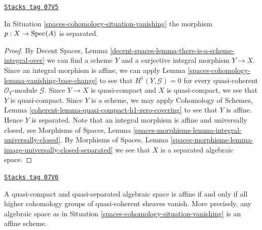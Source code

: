 \begin{lemma}
\label{spaces-cohomology-lemma-vanishing-separated}
\href{https://stacks.math.columbia.edu/tag/07V5}{\texttt{Stacks tag 07V5}}

In Situation \ref{spaces-cohomology-situation-vanishing} the morphism $p : X \to \operatorname{Spec}(A)$ is
separated.
\end{lemma}

\begin{proof}
By Decent Spaces, Lemma
\ref{decent-spaces-lemma-there-is-a-scheme-integral-over}
we can find a scheme $Y$ and a surjective integral morphism
$Y \to X$. Since an integral morphism is affine, we can apply
Lemma \ref{spaces-cohomology-lemma-vanishing-base-change}
to see that $H^1(Y, \mathcal{G}) = 0$ for every
quasi-coherent $\mathcal{O}_Y$-module $\mathcal{G}$.
Since $Y \to X$ is quasi-compact and $X$ is quasi-compact,
we see that $Y$ is quasi-compact.
Since $Y$ is a scheme, we may apply
Cohomology of Schemes, Lemma
\ref{coherent-lemma-quasi-compact-h1-zero-covering}
to see that $Y$ is affine. Hence $Y$ is separated.
Note that an integral morphism is affine and universally closed, see
Morphisms of Spaces, Lemma
\ref{spaces-morphisms-lemma-integral-universally-closed}.
By Morphisms of Spaces, Lemma
\ref{spaces-morphisms-lemma-image-universally-closed-separated}
we see that $X$ is a separated algebraic space.
\end{proof}

\begin{proposition}
\label{spaces-cohomology-proposition-vanishing-affine}
\href{https://stacks.math.columbia.edu/tag/07V6}{\texttt{Stacks tag 07V6}}


A quasi-compact and quasi-separated algebraic space is affine
if and only if all higher cohomology groups of quasi-coherent sheaves
vanish. More precisely, any algebraic space as in
Situation \ref{spaces-cohomology-situation-vanishing} is an affine scheme.
\end{proposition}

